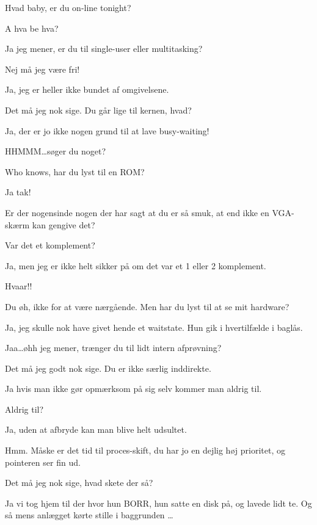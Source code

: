 \documentclass[a4paper,11pt]{article}
\begin{document}
\begin{sketch}
      Hvad baby, er du on-line tonight?

     A hva be hva?

     Ja jeg mener, er du til single-user eller multitasking?

     Nej må jeg være fri!

     Ja, jeg er heller ikke bundet af omgivelsene.

     Det må jeg nok sige. Du går lige til kernen, hvad?

     Ja, der er jo ikke nogen grund til at lave busy-waiting!

     HHMMM\ldots søger du noget?

     Who knows, har du lyst til en ROM?

     Ja tak!

     Er der nogensinde nogen der har sagt at du er så smuk, at end ikke en VGA-skærm kan gengive det?

     Var det et komplement?

     Ja, men jeg er ikke helt sikker på om det var et 1 eller 2 komplement.

     Hvaar!!


     Du øh, ikke for at være nærgående. Men har du lyst til at se mit hardware?

     Ja, jeg skulle nok have givet hende et waitstate. Hun gik i hvertilfælde i baglås.

     Jaa\ldots øhh jeg mener, trænger du til lidt intern afprøvning?

     Det må jeg godt nok sige. Du er ikke særlig inddirekte.

     Ja hvis man ikke gør opmærksom på sig selv kommer man aldrig til.

     Aldrig til?

     Ja, uden at afbryde kan man blive helt udsultet.

     Hmm. Måske er det tid til proces-skift, du har jo en dejlig høj prioritet, og pointeren ser fin ud.


     Det må jeg nok sige, hvad skete der så?

     Ja vi tog hjem til der hvor hun BORR, hun satte en disk på, og lavede lidt te. Og så mens anlægget kørte stille i baggrunden \ldots


\end{sketch}
\end{document}
